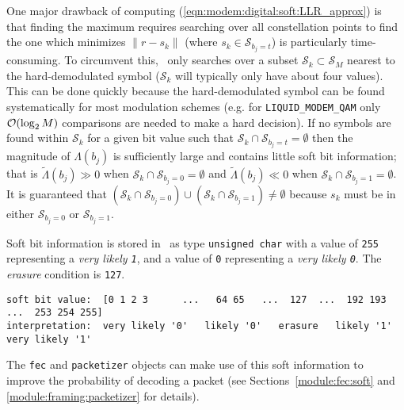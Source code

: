 % 
%
One major drawback of computing
(\ref{eqn:modem:digital:soft:LLR_approx}) is that finding the maximum
requires searching over all constellation points to find the one which
minimizes $\|r-s_k\|$
(where $s_k \in \mathcal{S}_{b_j=t}$) is particularly time-consuming.
To circumvent this, \liquid\ only searches over a subset
$\mathcal{S}_k \subset \mathcal{S}_M$ nearest to the
hard-demodulated symbol
($\mathcal{S}_k$ will typically only have about four values).
This can be done quickly because the hard-demodulated symbol can be
found systematically for most modulation schemes
(e.g. for {\tt LIQUID\_MODEM\_QAM} only $\mathcal{O}(\log_2 M)$ comparisons are
needed to make a hard decision).
%
If no symbols are found within $\mathcal{S}_k$ for a given bit value
such that $\mathcal{S}_k \cap \mathcal{S}_{b_j=t} = \emptyset$
then the magnitude of $\Lambda(b_j)$ is sufficiently large
and contains little soft bit information;
that is
$\tilde{\Lambda}(b_j) \gg 0$ when $\mathcal{S}_k \cap \mathcal{S}_{b_j=0} = \emptyset$
and
$\tilde{\Lambda}(b_j) \ll 0$ when $\mathcal{S}_k \cap \mathcal{S}_{b_j=1} = \emptyset$.
%
It is guaranteed that
$   \left( \mathcal{S}_k \cap \mathcal{S}_{b_j=0}\right)
        \cup
    \left( \mathcal{S}_k \cap \mathcal{S}_{b_j=1}\right)
    \neq \emptyset $
because $s_k$ must be in either $\mathcal{S}_{b_j=0}$ or
$\mathcal{S}_{b_j=1}$.
%

% 
%
Soft bit information is stored in \liquid\ as type {\tt unsigned char}
with a value of {\tt 255} representing a {\em very likely {\tt 1}},
and a value of {\tt 0} representing a {\em very likely {\tt 0}}.
The {\em erasure} condition is {\tt 127}.
%
\begin{Verbatim}[fontsize=\small]
soft bit value:  [0 1 2 3      ...   64 65   ...  127  ...  192 193   ...  253 254 255]
interpretation:  very likely '0'   likely '0'   erasure   likely '1'    very likely '1'
\end{Verbatim}
%
The {\tt fec}  and {\tt packetizer} objects can make use of this soft
information to improve the probability of decoding a packet
(see Sections~\ref{module:fec:soft} and
\ref{module:framing:packetizer} for details).

